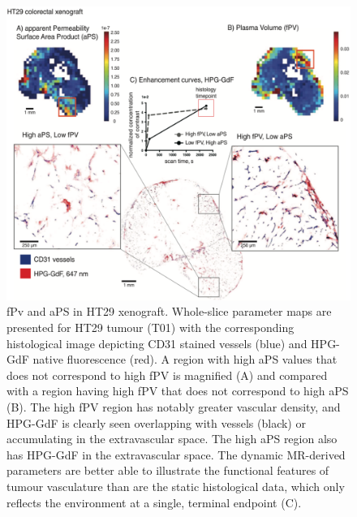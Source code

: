 \begin{figure}[htbp]
 \begin{center}
 \includegraphics[width=\textwidth]{hpg/hpg-paper1-images/hpg_fig5-ht29fpv.png}
 \caption{fPv and \acs{aPS} in HT29 xenograft.
 Whole-slice parameter maps are presented for HT29 tumour (T01) with the corresponding histological image depicting \acs{CD31} stained vessels (blue) and \acs{HPG-GdF} native fluorescence (red).
 A region with high \acs{aPS} values that does not correspond to high \acs{fPV} is magnified (A) and compared with a region having high \acs{fPV} that does not correspond to high \acs{aPS} (B).
 The high \acs{fPV} region has notably greater vascular density, and \acs{HPG-GdF} is clearly seen overlapping with vessels (black) or accumulating in the extravascular space.
 The high \acs{aPS} region also has \acs{HPG-GdF} in the extravascular space.
 The dynamic MR-derived parameters are better able to illustrate the functional features of tumour vasculature than are the static histological data, which only reflects the environment at a single, terminal endpoint (C).}
 \label{hpgpaper1:fig5}
 \end{center}
\end{figure}



